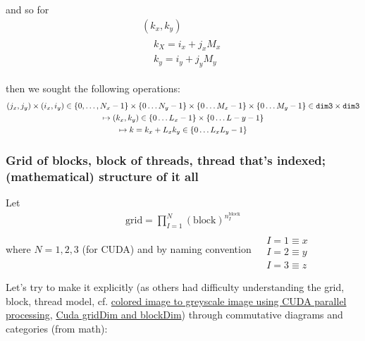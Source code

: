 \documentclass[10pt]{amsart}
\begin{document}
\begin{multicols*}{2}
and so for
\[
\begin{gathered}
  (k_x,k_y) \\
\begin{aligned}
  & k_X = i_x + j_x M_x \\ 
  & k_y = i_y + j_y M_y
  \end{aligned} 
  \end{gathered}
\]

then we sought the following operations:
\[
\begin{gathered}
  (j_x,j_y)\times (i_x,i_y) \in \lbrace 0 , \dots , N_x - 1 \rbrace \times \lbrace 0 \dots N_y - 1 \rbrace \times \lbrace 0 \dots M_x - 1 \rbrace \times \lbrace 0 \dots M_y - 1 \rbrace \in \verb|dim3| \times \verb|dim3| \\
  \mapsto (k_x,k_y) \in \lbrace 0 \dots L_x -1 \rbrace \times \lbrace 0 \dots L-y - 1 \rbrace \\
  \mapsto k = k_x + L_x k_y \in \lbrace 0 \dots L_x L_y - 1 \rbrace 
  \end{gathered}
\]

\subsubsection{Grid of blocks, block of threads, thread that's indexed; (mathematical) structure of it all}

Let
\[
\begin{gathered}
  \text{grid} = \prod_{I=1}^N (\text{block})^{n_I^{\text{block}}}
\end{gathered}
\]
where $N=1,2,3$ (for CUDA) and by naming convention $\begin{aligned} & \quad \\
  & I = 1 \equiv x \\
  & I = 2 \equiv y \\
  & I = 3 \equiv z \end{aligned}$

Let's try to make it explicitly (as others had difficulty understanding the grid, block, thread model, cf. \href{http://stackoverflow.com/questions/14711668/colored-image-to-greyscale-image-using-cuda-parallel-processing}{colored image to greyscale image using CUDA parallel processing}, \href{http://stackoverflow.com/questions/16619274/cuda-griddim-and-blockdim}{Cuda gridDim and blockDim}) through commutative diagrams and categories (from math):


\end{multicols*}
\end{document}
